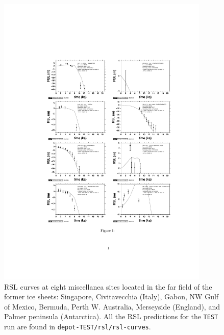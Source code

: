 \documentclass[11pt,fleqn,a4paper,titlepage]{article}
\begin{document}
\begin{figure}[h]
\begin{center}
\vspace{0.6cm}
\includegraphics[width=0.9\textwidth,angle=0]{./Figures/rsl-2.pdf}
\caption[Miscellanea RSL curves]{\small{RSL curves at eight miscellanea sites located in the far field of the former ice sheets: Singapore, Civitavecchia (Italy), Gabon, NW Gulf of Mexico, Bermuda, Perth W. Australia, Merseyside (England), and Palmer peninsula (Antarctica). All the RSL predictions for the
\texttt{TEST} run are found in \texttt{depot-TEST/rsl/rsl-curves}}.}
\label{fig:rsl-2}
\end{center}
\end{figure}
\newpage
\end{document}
